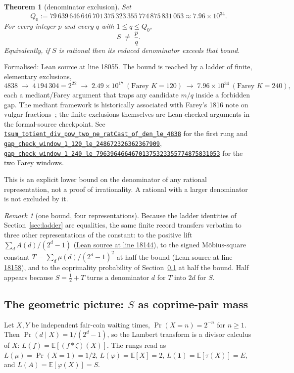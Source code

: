 \documentclass[11pt]{article}
\newcommand{\commit}{81150c1c6fdd4cd51e76d3aa0de344341e0e9e7c}
\newcommand{\repobase}{https://github.com/wcook04/plectis-lean-erdos249-257/blob/\commit}
\newcommand{\PK}{Erdos249257}
\newcommand{\lrefx}[3]{\href{\repobase/\PK/#1\#L#2}{\nolinkurl{#3}}}
\newcommand{\lloc}[2]{\href{\repobase/\PK/#1\#L#2}{Lean source at line #2}}
\newtheorem{theorem}{Theorem}[section]
\theoremstyle{definition}
\theoremstyle{remark}
\newtheorem*{remark}{Remark}
\newcommand{\ph}{\varphi}
\newcommand{\Qzero}{Q_0}
\begin{document}
\begin{theorem}[denominator exclusion]\label{res:farey}
Set
\[
\Qzero:=79\,639\,646\,646\,701\,375\,323\,355\,774\,875\,831\,053
       \approx7.96\times10^{34}.
\]
For every integer $p$ and every $q$ with $1\le q\le\Qzero$,
\[
S \;\ne\; \frac{p}{q}.
\]
Equivalently, if $S$ is rational then its reduced denominator exceeds that bound.
\end{theorem}
\noindent Formalised: \lloc{CertificateKernel.lean}{18055}.
The bound is reached by a ladder of finite, elementary exclusions,
\[
4838 \;\to\; 4\,194\,304 = 2^{22} \;\to\; 2.49\times10^{17}\ (\text{Farey } K{=}120)
\;\to\; 7.96\times10^{34}\ (\text{Farey } K{=}240),
\]
each a mediant/Farey argument that traps any candidate $m/q$ inside a forbidden
gap. The mediant framework is historically associated with Farey's 1816 note
on vulgar fractions~\cite{farey1816}; the finite exclusions themselves are
Lean-checked arguments in the formal-source checkpoint. See
\lrefx{CertificateKernel.lean}{15347}{tsum_totient_div_pow_two_ne_ratCast_of_den_le_4838}
for the first rung and \lrefx{GapFareyBound.lean}{88}{gap_check_window_1_120_le_248672326362367909},
\lrefx{GapFareyBound.lean}{176}{gap_check_window_1_240_le_79639646646701375323355774875831053}
for the two Farey windows.

This is an explicit lower bound on the denominator of any rational
representation, not a proof of irrationality. A rational with a larger
denominator is not excluded by it.

\begin{remark}[one bound, four representations]
Because the ladder identities of Section~\ref{sec:ladder} are equalities, the same
finite record transfers verbatim to three other representations of the constant:
to the positive lift $\sum_d A(d)/(2^d-1)$
(\lloc{CertificateKernel.lean}{18144}),
to the signed M\"obius-square constant $T=\sum_d\mu(d)/(2^d-1)^2$ at half the bound
(\lloc{CertificateKernel.lean}{18158}),
and to the coprimality probability of Section~\ref{sec:geom} at half the bound.
Half appears because $S=\tfrac12+T$ turns a denominator $d$ for $T$ into $2d$ for $S$.
\end{remark}

\subsection{The geometric picture: $S$ as coprime-pair mass}\label{sec:geom}

Let $X,Y$ be independent fair-coin waiting times, $\Pr(X=n)=2^{-n}$ for $n\ge1$.
Then $\Pr(d\mid X)=1/(2^d-1)$, so the Lambert transform is a divisor calculus of
$X$: $L(f)=\mathbb E[(f*\zeta)(X)]$. The rungs read as $L(\mu)=\Pr(X=1)=1/2$,
$L(\ph)=\mathbb E[X]=2$, $L(\mathbf 1)=\mathbb E[\tau(X)]=E$, and $L(A)=\mathbb E[\ph(X)]=S$.
\end{document}
